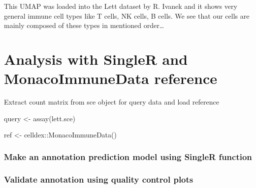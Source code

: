 \documentclass[
  letterpaper,
  DIV=11,
  numbers=noendperiod]{scrartcl}
\newenvironment{Shaded}{\begin{snugshade}}{\end{snugshade}}
\newcommand{\AttributeTok}[1]{\textcolor[rgb]{0.40,0.45,0.13}{#1}}
\newcommand{\FunctionTok}[1]{\textcolor[rgb]{0.28,0.35,0.67}{#1}}
\newcommand{\NormalTok}[1]{\textcolor[rgb]{0.00,0.23,0.31}{#1}}
\newcommand{\OtherTok}[1]{\textcolor[rgb]{0.00,0.23,0.31}{#1}}
\newcommand{\SpecialCharTok}[1]{\textcolor[rgb]{0.37,0.37,0.37}{#1}}
\begin{document}
This UMAP was loaded into the Lett dataset by R. Ivanek and it shows
very general immune cell types like T cells, NK cells, B cells. We see
that our cells are mainly composed of these types in mentioned
order\ldots{}

\hypertarget{analysis-with-singler-and-monacoimmunedata-reference}{%
\section{Analysis with SingleR and MonacoImmuneData
reference}\label{analysis-with-singler-and-monacoimmunedata-reference}}

Extract count matrix from sce object for query data and load reference

\begin{Shaded}
\begin{Highlighting}[]
\NormalTok{query }\OtherTok{\textless{}{-}} \FunctionTok{assay}\NormalTok{(lett.sce) }

\NormalTok{ref }\OtherTok{\textless{}{-}}\NormalTok{ celldex}\SpecialCharTok{::}\FunctionTok{MonacoImmuneData}\NormalTok{()}
\end{Highlighting}
\end{Shaded}

\hypertarget{make-an-annotation-prediction-model-using-singler-function}{%
\subsubsection{Make an annotation prediction model using SingleR
function}\label{make-an-annotation-prediction-model-using-singler-function}}

\begin{Shaded}
\end{Shaded}

\hypertarget{validate-annotation-using-quality-control-plots}{%
\subsubsection{Validate annotation using quality control
plots}\label{validate-annotation-using-quality-control-plots}}
\end{document}
